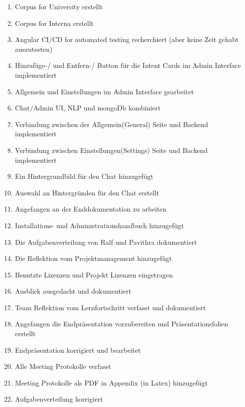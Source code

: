 \begin{enumerate}
    \item Corpus for University erstellt
    \item Corpus for Interna erstellt
    \item Angular CI/CD for automated testing recherchiert (aber keine Zeit gehabt auszutesten)
    \item Hinzufüge-/ und Entfern-/ Button für die Intent Cards im Admin Interface implementiert
    \item Allgemein und Einstellungen im Admin Interface gearbeitet
    \item Chat/Admin UI, NLP und mongoDb kombiniert
    \item Verbindung zwischen der Allgemein(General) Seite und Backend implementiert
    \item Verbindung zwischen Einstellungen(Settings) Seite und Backend implementiert
    \item Ein Hintergrundbild für den Chat hinzugefügt
    \item Auswahl an Hintergründen für den Chat erstellt
    \item Angefangen an der Enddokumentation zu arbeiten
    \item Installations- und Administrationshandbuch hinzugefügt
    \item Die Aufgabenverteilung von Ralf und Pavithra dokumentiert
    \item Die Reflektion vom Projektmanagement hinzugefügt
    \item Benutzte Lizenzen und Projekt Lizenzen eingetragen
    \item Ausblick ausgedacht und dokumentiert
    \item Team Reflektion vom Lernfortschritt verfasst und dokumentiert
    \item Angefangen die Endpräsentation vorzubereiten und Präsentationsfolien erstellt
    \item Endpräsentation korrigiert und bearbeitet
    \item Alle Meeting Protokolle verfasst
    \item Meeting Protokolle als PDF in Appendix (in Latex) hinzugefügt
    \item Aufgabenverteilung korrigiert
\end{enumerate}

